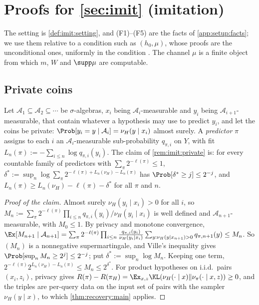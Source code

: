 \section{Proofs for \texorpdfstring{\cref{sec:imit}}{Section \ref*{sec:imit}} (imitation)}\label{app:imit}

The setting is \cref{def:imit:setting}, and (F1)--(F5) are the facts of \cref{app:setup:facts}; we use them relative to a condition such as $(h_0,\mu)$, whose proofs are the unconditional ones, uniformly in the condition \citep{li2008introduction}. The channel $\mu$ is a finite object from which $m$, $W$ and $\supp\mu$ are computable.

\subsection{Private coins}\label{app:imit:private}

Let $\mathcal A_1\subseteq\mathcal A_2\subseteq\cdots$ be $\sigma$-algebras, $x_i$ being $\mathcal A_i$-measurable and $y_i$ being $\mathcal A_{i+1}$-measurable, that contain whatever a hypothesis may use to predict $y_i$, and let the coins be private: $\Prob[y_i=y\mid\mathcal A_i]=\nu_H(y\mid x_i)$ almost surely. A \emph{predictor} $\pi$ assigns to each $i$ an $\mathcal A_i$-measurable sub-probability $q_{\pi,i}$ on $Y$, with fit $L_n(\pi):=-\sum_{i\le n}\log q_{\pi,i}(y_i)$. The claim of \cref{rem:imit:private} is: for every countable family of predictors with $\sum_\pi2^{-\ell(\pi)}\le1$, $\delta^*:=\sup_n\log\sum_\pi2^{-\ell(\pi)+L_n(\nu_H)-L_n(\pi)}$ has $\Prob[\delta^*\ge j]\le2^{-j}$, and $L_n(\pi)\ge L_n(\nu_H)-\ell(\pi)-\delta^*$ for all $\pi$ and $n$.

\begin{proof}[Proof of the claim]
Almost surely $\nu_H(y_i\mid x_i)>0$ for all $i$, so $M_n:=\sum_\pi2^{-\ell(\pi)}\prod_{i\le n}q_{\pi,i}(y_i)/\nu_H(y_i\mid x_i)$ is well defined and $\mathcal A_{n+1}$-measurable, with $M_0\le1$. By privacy and monotone convergence, $\Ex[M_{n+1}\mid\mathcal A_{n+1}]=\sum_\pi2^{-\ell(\pi)}\prod_{i\le n}\frac{q_{\pi,i}(y_i)}{\nu_H(y_i\mid x_i)}\sum_{y:\nu_H(y\mid x_{n+1})>0}q_{\pi,n+1}(y)\le M_n$. So $(M_n)$ is a nonnegative supermartingale, and Ville's inequality \citep{ville1939etude} gives $\Prob[\sup_nM_n\ge2^j]\le2^{-j}$; put $\delta^*:=\sup_n\log M_n$. Keeping one term, $2^{-\ell(\pi)}2^{L_n(\nu_H)-L_n(\pi)}\le M_n\le2^{\delta^*}$. For product hypotheses on i.i.d.\ pairs $(x_i,z_i)$, privacy gives $R(\pi)-R(\pi_H)=\Ex_{x,z}\KL(\nu_H(\cdot\mid x)\Vert\nu_\pi(\cdot\mid x,z))\ge0$, and the triples are per-query data on the input set of pairs with the sampler $\nu_H(y\mid x)$, to which \cref{thm:recovery:main} applies.
\end{proof}

